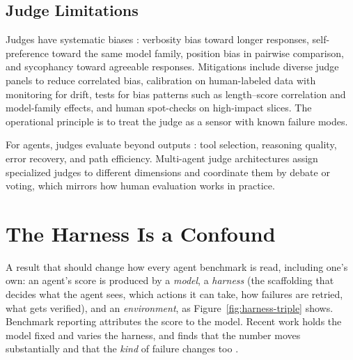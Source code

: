\documentclass[11pt]{book}
\begin{document}
\subsection{Judge Limitations}

Judges have systematic biases \cite{llmasjudge2025}: verbosity bias toward longer responses, self-preference toward the same model family, position bias in pairwise comparison, and sycophancy toward agreeable responses. Mitigations include diverse judge panels to reduce correlated bias, calibration on human-labeled data with monitoring for drift, tests for bias patterns such as length--score correlation and model-family effects, and human spot-checks on high-impact slices. The operational principle is to treat the judge as a sensor with known failure modes.

For agents, judges evaluate beyond outputs \cite{arizellmjudge2025}: tool selection, reasoning quality, error recovery, and path efficiency. Multi-agent judge architectures \cite{multiagentjudge2025} assign specialized judges to different dimensions and coordinate them by debate or voting, which mirrors how human evaluation works in practice.

\section{The Harness Is a Confound}
\label{sec:harness}

A result that should change how every agent benchmark is read, including one's own: an agent's score is produced by a \textit{model}, a \textit{harness} (the scaffolding that decides what the agent sees, which actions it can take, how failures are retried, what gets verified), and an \textit{environment}, as Figure~\ref{fig:harness-triple} shows. Benchmark reporting attributes the score to the model. Recent work holds the model fixed and varies the harness, and finds that the number moves substantially and that the \textit{kind} of failure changes too \cite{modelharness2026, uniace2026}.
\end{document}
